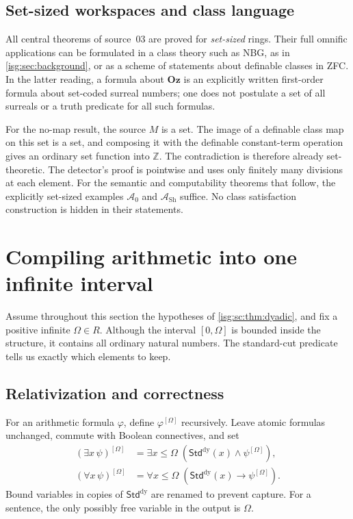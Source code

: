 \documentclass[11pt]{article}
\theoremstyle{definition}
\theoremstyle{remark}
\newcommand{\Oz}{\ensuremath{\mathbf{Oz}}}
\newcommand{\Z}{\mathbb{Z}}
\newcommand{\StdDy}{\mathsf{Std}^{\mathrm{dy}}}
\newcommand{\Asc}{\mathcal{A}}
\begin{document}
\subsection{Set-sized workspaces and class language}\label{isg:sc:sec:classes}
All central theorems of source~03 are proved for \emph{set-sized} rings.
Their full omnific applications can be formulated in a class theory such
as NBG, as in \cref{isg:sec:background}, or as a scheme of statements
about definable classes in ZFC. In the latter reading, a formula about
$\Oz$ is an explicitly written first-order formula about set-coded surreal
numbers; one does not postulate a set of all surreals or a truth predicate
for all such formulas.

For the no-map result, the source $M$ is a set. The image of a definable
class map on this set is a set, and composing it with the definable
constant-term operation gives an ordinary set function into $\Z$. The
contradiction is therefore already set-theoretic. The detector's proof is
pointwise and uses only finitely many divisions at each element. For the
semantic and computability theorems that follow, the explicitly set-sized
examples $\Asc_0$ and $\Asc_{\mathrm{Sh}}$ suffice. No class satisfaction
construction is hidden in their statements.

\section{Compiling arithmetic into one infinite interval}\label{isg:sc:sec:compiler}
Assume throughout this section the hypotheses of \cref{isg:sc:thm:dyadic},
and fix a positive infinite $\Omega\in R$. Although the interval
$[0,\Omega]$ is bounded inside the structure, it contains all ordinary
natural numbers. The standard-cut predicate tells us exactly which elements
to keep.

\subsection{Relativization and correctness}
For an arithmetic formula $\varphi$, define $\varphi^{[\Omega]}$
recursively. Leave atomic formulas unchanged, commute with Boolean
connectives, and set
\begin{align}
 (\exists x\,\psi)^{[\Omega]}&=
    \exists x\le\Omega\;(\StdDy(x)\wedge\psi^{[\Omega]}),\label{isg:sc:eq:etrans}\\
 (\forall x\,\psi)^{[\Omega]}&=
    \forall x\le\Omega\;(\StdDy(x)\to\psi^{[\Omega]}).\label{isg:sc:eq:utrans}
\end{align}
Bound variables in copies of $\StdDy$ are renamed to prevent capture. For
a sentence, the only possibly free variable in the output is $\Omega$.
\end{document}
